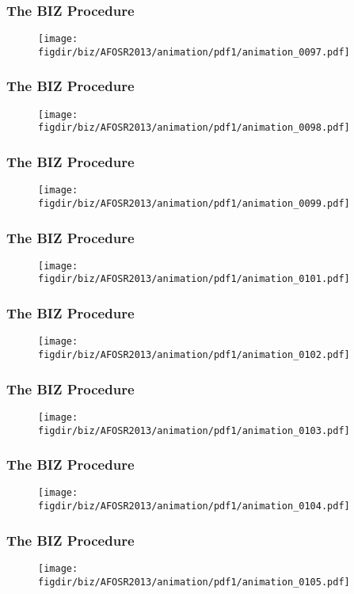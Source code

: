 \documentclass[13pt]{beamer}
\newcommand{\figdir}{../../fig}
\begin{document}
\begin{frame}\frametitle{The BIZ Procedure}\begin{figure}\texttt{[image: \\figdir/biz/AFOSR2013/animation/pdf1/animation\_0097.pdf]}\end{figure}\end{frame}
\begin{frame}\frametitle{The BIZ Procedure}\begin{figure}\texttt{[image: \\figdir/biz/AFOSR2013/animation/pdf1/animation\_0098.pdf]}\end{figure}\end{frame}
\begin{frame}\frametitle{The BIZ Procedure}\begin{figure}\texttt{[image: \\figdir/biz/AFOSR2013/animation/pdf1/animation\_0099.pdf]}\end{figure}\end{frame}
\begin{frame}\frametitle{The BIZ Procedure}\begin{figure}\texttt{[image: \\figdir/biz/AFOSR2013/animation/pdf1/animation\_0101.pdf]}\end{figure}\end{frame}
\begin{frame}\frametitle{The BIZ Procedure}\begin{figure}\texttt{[image: \\figdir/biz/AFOSR2013/animation/pdf1/animation\_0102.pdf]}\end{figure}\end{frame}
\begin{frame}\frametitle{The BIZ Procedure}\begin{figure}\texttt{[image: \\figdir/biz/AFOSR2013/animation/pdf1/animation\_0103.pdf]}\end{figure}\end{frame}
\begin{frame}\frametitle{The BIZ Procedure}\begin{figure}\texttt{[image: \\figdir/biz/AFOSR2013/animation/pdf1/animation\_0104.pdf]}\end{figure}\end{frame}
\begin{frame}\frametitle{The BIZ Procedure}\begin{figure}\texttt{[image: \\figdir/biz/AFOSR2013/animation/pdf1/animation\_0105.pdf]}\end{figure}\end{frame}
\end{document}

